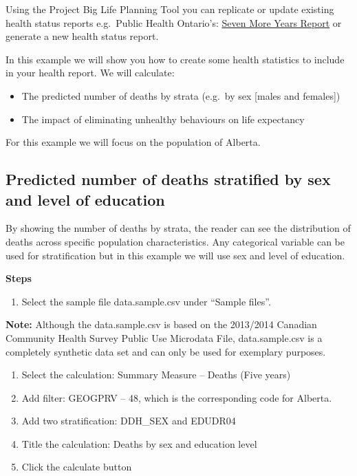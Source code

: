 \documentclass[]{book}
\providecommand{\tightlist}{%
  \setlength{\itemsep}{0pt}\setlength{\parskip}{0pt}}
\begin{document}
Using the Project Big Life Planning Tool you can replicate or update
existing health status reports e.g.~Public Health Ontario's:
\href{https://www.ices.on.ca/Publications/Atlases-and-Reports/2012/Seven-More-Years}{Seven
More Years Report} or generate a new health status report.

In this example we will show you how to create some health statistics to
include in your health report. We will calculate:

\begin{itemize}
\tightlist
\item
  The predicted number of deaths by strata (e.g.~by sex {[}males and
  females{]})
\item
  The impact of eliminating unhealthy behaviours on life expectancy
\end{itemize}

For this example we will focus on the population of Alberta.

\subsection{Predicted number of deaths stratified by sex and level of
education}\label{predicted-number-of-deaths-stratified-by-sex-and-level-of-education}

By showing the number of deaths by strata, the reader can see the
distribution of deaths across specific population characteristics. Any
categorical variable can be used for stratification but in this example
we will use sex and level of education.

\textbf{Steps}

\begin{enumerate}
\def\labelenumi{\arabic{enumi}.}
\tightlist
\item
  Select the sample file data.sample.csv under ``Sample files''.
\end{enumerate}

\textbf{Note:} Although the data.sample.csv is based on the 2013/2014
Canadian Community Health Survey Public Use Microdata File,
data.sample.csv is a completely synthetic data set and can only be used
for exemplary purposes.

\begin{enumerate}
\def\labelenumi{\arabic{enumi}.}
\setcounter{enumi}{1}
\item
  Select the calculation: Summary Measure -- Deaths (Five years)
\item
  Add filter: GEOGPRV -- 48, which is the corresponding code for
  Alberta.
\item
  Add two stratification: DDH\_SEX and EDUDR04
\item
  Title the calculation: Deaths by sex and education level
\item
  Click the calculate button
\end{enumerate}
\end{document}

